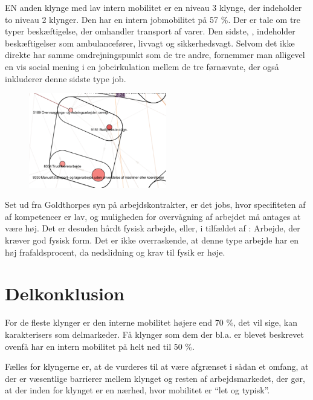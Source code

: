 EN anden klynge  med lav intern mobilitet er en niveau 3 klynge, der indeholder to niveau 2 klynger. Den har en intern jobmobilitet på 57 \%. Der er tale om tre typer beskæftigelse, der omhandler transport af varer. Den sidste, , indeholder beskæftigelser som ambulancefører, livvagt og sikkerhedsvagt. Selvom det ikke direkte har samme omdrejningspunkt som de tre andre, fornemmer man alligevel en vis social mening i en jobcirkulation mellem de tre førnævnte, der også inkluderer denne sidste type job. 

%
\begin{figure}
  \vspace{-20pt}
  \begin{center}
    \includegraphics[width=6cm]{fig/segzoom/seg_3_24_internmob.pdf}
   \caption{}
   \label{fig_delanalyse1_zoom_3_24}
  \end{center}
  \vspace{-20pt}
\end{figure}
%

Set ud fra Goldthorpes syn på arbejdskontrakter, er det jobs, hvor specifiteten af af kompetencer er lav, og muligheden for overvågning af arbejdet må antages at være høj. Det er desuden hårdt fysisk arbejde, eller, i  tilfældet af : Arbejde, der kræver god fysisk form. Det er ikke overraskende, at denne type arbejde har en høj frafaldsprocent, da nedslidning og krav til fysik er høje. %



\section{Delkonklusion \label{}}
For de fleste klynger er den interne mobilitet højere end 70 \%, det vil sige, kan karakterisers som delmarkeder. Få klynger som dem der bl.a. er blevet beskrevet ovenfå har en intern mobilitet på helt ned til 50 \%. 


Fælles for klyngerne er, at de vurderes til at være afgrænset i sådan et omfang, at der er væsentlige barrierer mellem klynget og resten af arbejdsmarkedet, der gør, at der inden for klynget er en nærhed, hvor mobilitet er “let og typisk”.

